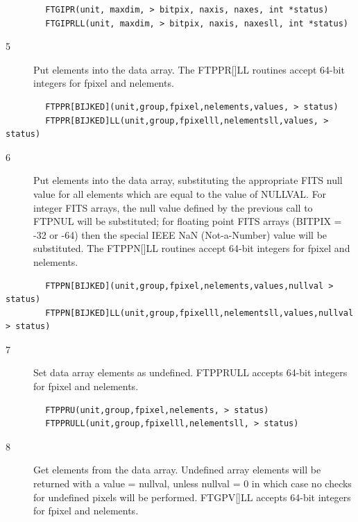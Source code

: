 \documentclass[11pt]{book}
\begin{document}
\begin{verbatim}
        FTGIPR(unit, maxdim, > bitpix, naxis, naxes, int *status)
        FTGIPRLL(unit, maxdim, > bitpix, naxis, naxesll, int *status)
\end{verbatim}

\begin{description}
\item[5 ]Put elements into the data array.  The FTPPR[]LL routines
      accept 64-bit integers for fpixel and nelements.
\end{description}

\begin{verbatim}
        FTPPR[BIJKED](unit,group,fpixel,nelements,values, > status)
        FTPPR[BIJKED]LL(unit,group,fpixelll,nelementsll,values, > status)
\end{verbatim}

\begin{description}
\item[6 ]Put elements into the data array, substituting the appropriate FITS null
   value for all elements which are equal to the value of NULLVAL.  For
   integer FITS arrays, the null value defined by the previous call to FTPNUL
   will be substituted;  for floating point FITS arrays (BITPIX = -32
   or -64) then the special IEEE NaN (Not-a-Number) value will be
  substituted.  The FTPPN[]LL routines accept 64-bit integers for
  fpixel and nelements.
\end{description}

\begin{verbatim}
        FTPPN[BIJKED](unit,group,fpixel,nelements,values,nullval > status)
        FTPPN[BIJKED]LL(unit,group,fpixelll,nelementsll,values,nullval > status)
\end{verbatim}

\begin{description}
\item[7 ]Set data array elements as undefined.  FTPPRULL accepts 64-bit integers
         for fpixel and nelements.
\end{description}

\begin{verbatim}
        FTPPRU(unit,group,fpixel,nelements, > status)
        FTPPRULL(unit,group,fpixelll,nelementsll, > status)
\end{verbatim}

\begin{description}
\item[8 ] Get elements from the data array.  Undefined array elements will be
    returned with a value = nullval, unless nullval = 0 in which case no
   checks for undefined pixels will be performed.  FTGPV[]LL accepts
   64-bit integers for fpixel and nelements.
\end{description}
\end{document}
